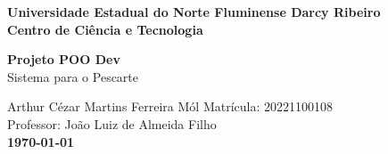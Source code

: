 
\begin{center}
\hfill
\begin{minipage}[b]{0.80\textwidth}
  \textbf{\Large Universidade Estadual do Norte Fluminense Darcy Ribeiro}\\
  \centering
    \textbf{\Large Centro de Ciência e Tecnologia}\\
\end{minipage}
\vspace{200pt}

        \huge{\textbf{Projeto POO Dev}}\\ %
        \Large{Sistema para o Pescarte}\\ %
        
        \vspace{150pt}
        
        \vspace{40pt} 

        \hfill Arthur Cézar Martins Ferreira Mól \hspace{20pt} Matrícula: 20221100108\\

        \vspace{25pt}
        \hfill {Professor: João Luiz de Almeida Filho}\\ 
     
        \vspace{\fill}
        \LARGE \textbf{\today}
          
	\end{center}


\newpage

